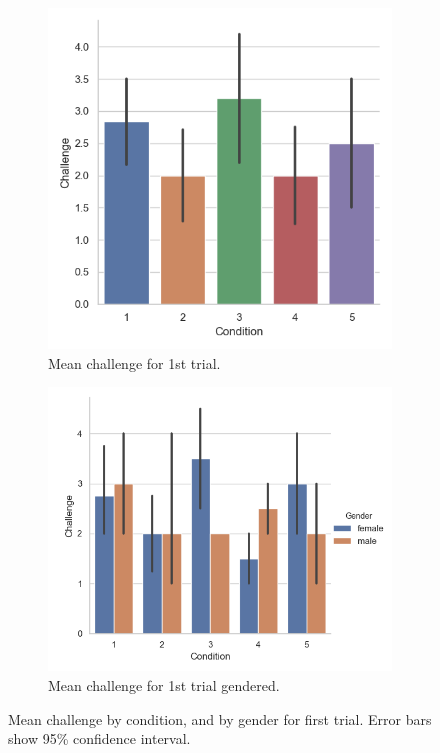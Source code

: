 \begin{figure}[H]
 \begin{subfigure}[b]{0.5\textwidth}
     \centering
     \includegraphics[scale=0.5]{Files/Plots/challenge_first_trial.png}
     \caption{Mean challenge for 1st trial.}
     \label{fig:meanChal1st}
 \end{subfigure}
  \begin{subfigure}[b]{0.5\textwidth}
     \centering
     \includegraphics[scale=0.5]{Files/Plots/challenge_first_trial_gen.png}
     \caption{Mean challenge for 1st trial gendered.}
     \label{fig:meanChalGen1st}
 \end{subfigure}
     \caption{Mean challenge by condition, and by gender for first trial. Error bars show 95\%  confidence interval.}
    \label{fig:Chal1st}
\end{figure}

